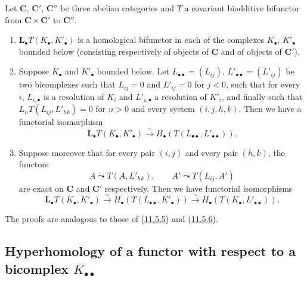 \begin{proposition}[11.6.5]
\label{0.11.6.5}
Let $\boldsymbol{C}$, $\boldsymbol{C}'$, $\boldsymbol{C}''$ be three abelian
categories and $T$ a covariant biadditive bifunctor from
$\boldsymbol{C}\times\boldsymbol{C}'$ to $\boldsymbol{C}''$.
\begin{enumerate}
\item[{\rm(i)}] {$\mathbf{L}_\bullet T(K_\bullet,K'_\bullet)$ is a homological
bifunctor in each of the complexes $K_\bullet$, $K'_\bullet$ bounded below
(consisting respectively of objects of $\boldsymbol{C}$ and of objects of
$\boldsymbol{C}'$).}
\item[{\rm(ii)}] {Suppose $K_\bullet$ and $K'_\bullet$ bounded
below. Let $L_{\bullet\bullet}=(L_{ij})$,
$L'_{\bullet\bullet}=(L'_{ij})$ be two bicomplexes such that $L_{ij}=0$ and
$L'_{ij}=0$ for $j<0$, such that for every $i$, $L_{i,\bullet}$ is a
resolution of $K_i$ and $L'_{i,\bullet}$ a resolution of $K'_i$, and finally such that
$L_nT(L_{ij},L'_{hk})=0$ for $n>0$ and every system $(i,j,h,k)$. Then we have
a functorial isomorphism}
\[
\label{0.11.6.5.1}
\tag{11.6.5.1}
\mathbf{L}_\bullet T(K_\bullet,K'_\bullet)
\xrightarrow{\sim} H_\bullet(T(L_{\bullet\bullet},L'_{\bullet\bullet})).
\]
\item[{\rm(iii)}] {Suppose moreover that for every pair $(i,j)$ and
every pair $(h,k)$, the functors
\[
A\leadsto T(A,L'_{hk}),\qquad
A'\leadsto T(L_{ij},A')
\]
are exact on $\boldsymbol{C}$ and $\boldsymbol{C}'$ respectively. Then we have
functorial isomorphisms}
\[
\label{0.11.6.5.2}
\tag{11.6.5.2}
\mathbf{L}_\bullet T(K_\bullet,K'_\bullet)
\xrightarrow{\sim} H_\bullet(T(L_{\bullet\bullet},K'_\bullet))
\xrightarrow{\sim} H_\bullet(T(K_\bullet,L'_{\bullet\bullet})).
\]
\end{enumerate}
\upshape The proofs are analogous to those of
\textup{(\hyperref[0.11.5.5]{11.5.5})} and \textup{(\hyperref[0.11.5.6]{11.5.6})}.
\end{proposition}


\subsection{Hyperhomology of a functor with respect to a bicomplex
$K_{\bullet\bullet}$}
\label{subsection:0.11.7}


